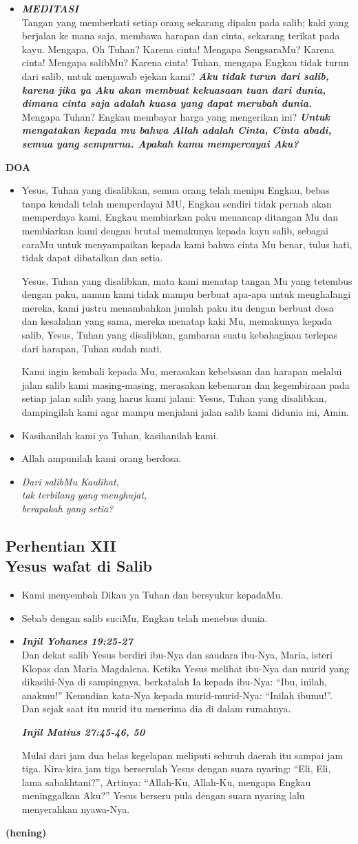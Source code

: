 \documentclass[a5paper,titlepage,11pt,openany]{scrbook}
\newcommand{\BU}[1]{\begin{itemize} \item[U:] #1 \end{itemize}}
\newcommand{\BP}[1]{\begin{itemize} \item[P:] #1 \end{itemize}}
\newcommand{\kamiMenyembah}{\BP{ Kami menyembah Dikau ya Tuhan dan bersyukur kepadaMu.}
\BU{Sebab dengan salib suciMu, Engkau telah menebus dunia.}
}
\newcommand{\kasihanilahKami}{\BP{Kasihanilah kami ya Tuhan, kasihanilah kami.}
\BU{Allah ampunilah kami orang berdosa.}}
\newcommand{\BPi}[2]
{\begin{itemize} \item[P1:] \textbf{\emph{#1}}\\#2 \end{itemize}}
\newcommand{\BPii}[1]
{\begin{itemize} \item[P2:] \textbf{\emph{MEDITASI}}\\#1 \end{itemize}}
\newcommand{\lagu}[2]{%
\begin{itemize}
\item[#1.] \it{#2}
\end{itemize}}
\newcommand{\henti}[2]{%
\subsection*{Perhentian #1\\#2 } 
\kamiMenyembah
}
\begin{document}
\BPii{
	Tangan yang memberkati setiap orang sekarang dipaku pada salib; kaki yang berjalan ke mana saja, membawa harapan dan cinta, sekarang terikat pada kayu. Mengapa, Oh Tuhan? Karena cinta!  Mengapa SengsaraMu? Karena cinta! Mengapa salibMu? Karena cinta! Tuhan, mengapa Engkau tidak turun dari salib, untuk menjawab ejekan kami? \textbf{\emph{Aku tidak turun dari salib, karena jika ya Aku akan membuat kekuasaan tuan dari dunia, dimana cinta saja adalah kuasa yang dapat merubah dunia.}} Mengapa Tuhan? Engkau membayar harga yang mengerikan ini? \textbf{\emph{Untuk mengatakan kepada mu bahwa Allah adalah Cinta, Cinta abadi, semua yang sempurna. Apakah kamu mempercayai Aku?}}}

\textbf{DOA}

\BU{Yesus, Tuhan yang disalibkan, semua orang telah menipu Engkau, bebas tanpa kendali telah memperdayai MU, Engkau sendiri tidak pernah akan memperdaya kami, Engkau membiarkan paku menancap ditangan Mu dan membiarkan kami dengan brutal memakunya kepada kayu salib, sebagai caraMu untuk menyampaikan kepada kami bahwa cinta Mu benar, tulus hati, tidak dapat dibatalkan dan setia. 

Yesus, Tuhan yang disalibkan, mata kami menatap tangan Mu yang tetembus dengan paku, namun kami tidak mampu berbuat apa-apa untuk menghalangi mereka, kami justru menambahkan jumlah paku itu dengan berbuat dosa dan kesalahan yang sama, mereka menatap kaki Mu, memakunya kepada salib, Yesus, Tuhan yang disalibkan, gambaran suatu kebahagiaan terlepas dari harapan, Tuhan sudah mati. 

Kami ingin kembali kepada Mu, merasakan kebebasan dan harapan melalui jalan salib kami masing-masing, merasakan kebenaran dan kegembiraan pada setiap jalan salib yang harus kami jalani: Yesus, Tuhan yang disalibkan, dampingilah kami agar mampu menjalani jalan salib kami didunia ini, Amin.}


\kasihanilahKami

\lagu{12}{Dari salibMu Kaulihat,\\
tak terbilang yang menghujat,\\
berapakah yang setia?}
\henti{XII}{	Yesus wafat di Salib}

\BPi{	Injil Yohanes 19:25-27 }{
	Dan dekat salib Yesus berdiri ibu-Nya dan saudara ibu-Nya, Maria, isteri Klopas dan Maria Magdalena. Ketika Yesus melihat ibu-Nya dan murid yang dikasihi-Nya di sampingnya, berkatalah Ia kepada ibu-Nya: ``Ibu, inilah, anakmu!'' Kemudian kata-Nya kepada murid-murid-Nya: ``Inilah ibumu!''. Dan sejak saat itu murid itu menerima dia di dalam rumahnya. 

\textbf{\emph{	Injil Matius 27:45-46, 50}}

	Mulai dari jam dua belas kegelapan meliputi seluruh daerah itu sampai jam tiga. Kira-kira jam tiga berserulah Yesus dengan suara nyaring: ``Eli, Eli, lama sabakhtani?'', Artinya: ``Allah-Ku, Allah-Ku, mengapa Engkau meninggalkan Aku?'' Yesus berseru pula dengan suara nyaring lalu menyerahkan nyawa-Nya. }\textbf{(hening)}
\end{document}
